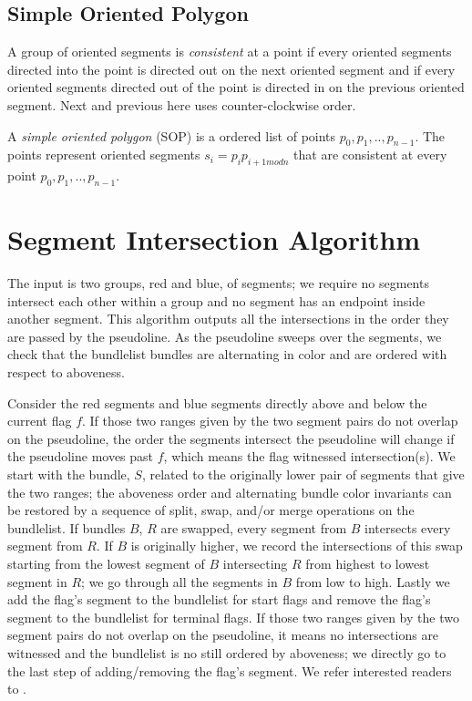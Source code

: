 \documentclass[11pt]{article}
\begin{document}
\subsection{Simple Oriented Polygon}
A group of oriented segments is \textit{consistent} at a point if every oriented segments directed into the point is directed out on the next oriented segment and if every oriented segments directed out of the point is directed in on the previous oriented segment.
Next and previous here uses counter-clockwise order.

A \textit{simple oriented polygon} (SOP) is a ordered list of points $p_0,p_1,..,p_{n-1}$.
The points represent oriented segments $s_i=p_ip_{i+1 mod n}$ that are consistent at every point $p_0,p_1,..,p_{n-1}$.

\section{Segment Intersection Algorithm} \label{sec inter}
The input is two groups, red and blue, of segments; we require no segments intersect each other within a group and no segment has an endpoint inside another segment.
This algorithm outputs all the intersections in the order they are passed by the pseudoline.
As the pseudoline sweeps over the segments, we check that the bundlelist bundles are alternating in color and are ordered with respect to aboveness.

Consider the red segments and blue segments directly above and below the current flag $f$. 
If those two ranges given by the two segment pairs do not overlap on the pseudoline, the order the segments intersect the pseudoline will change if the pseudoline moves past $f$, which means the flag witnessed intersection(s).
We start with the bundle, $S$, related to the originally lower pair of segments that give the two ranges; the aboveness order and alternating bundle color invariants can be restored by a sequence of split, swap, and/or merge operations on the bundlelist.
If bundles $B$, $R$ are swapped, every segment from $B$ intersects every segment from $R$.
If $B$ is originally higher, we record the intersections of this swap starting from the lowest segment of $B$ intersecting $R$ from highest to lowest segment in $R$; we go through all the segments in $B$ from low to high.
Lastly we add the flag's segment to the bundlelist for start flags and remove the flag's segment to the bundlelist for terminal flags.
If those two ranges given by the two segment pairs do not overlap on the pseudoline, it means no intersections are witnessed and the bundlelist is no still ordered by aboveness; we directly go to the last step of adding/removing the flag's segment.
We refer interested readers to \cite{MS}.
\end{document}
